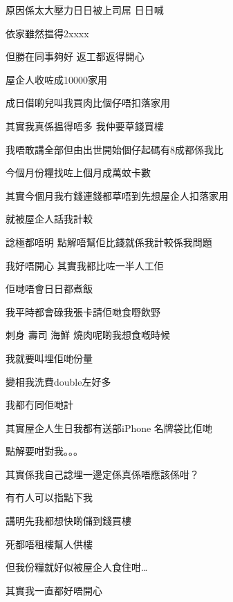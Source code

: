 原因係太大壓力日日被上司屌 日日喊

依家雖然揾得2xxxx

但勝在同事夠好 返工都返得開心

屋企人收咗成10000家用

成日借啲兒叫我買肉比個仔唔扣落家用

其實我真係揾得唔多 我仲要草錢買樓

我唔敢講全部但由出世開始個仔起碼有8成都係我比

今個月份糧找咗上個月成萬蚊卡數

其實今個月我冇錢連錢都草唔到先想屋企人扣落家用

就被屋企人話我計較

諗極都唔明 點解唔幫佢比錢就係我計較係我問題

我好唔開心 其實我都比咗一半人工佢

佢哋唔會日日都煮飯

我平時都會碌我張卡請佢哋食嘢飲野

刺身 壽司 海鮮 燒肉呢啲我想食嘅時候

我就要叫埋佢哋份量

變相我洗費double左好多

我都冇同佢哋計

其實屋企人生日我都有送部iPhone 名牌袋比佢哋

點解要咁對我。。。

其實係我自己諗埋一邊定係真係唔應該係咁？

有冇人可以指點下我

講明先我都想快啲儲到錢買樓

死都唔租樓幫人供樓

但我份糧就好似被屋企人食住咁…

其實我一直都好唔開心

